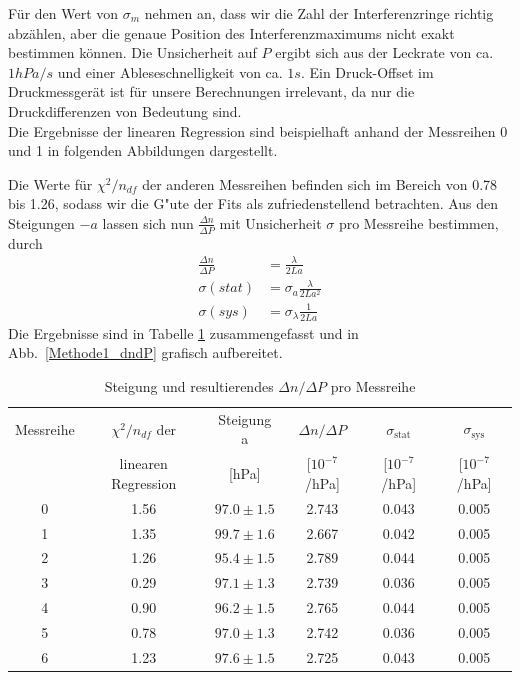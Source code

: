 \documentclass[12pt,a4paper]{article}
\begin{document}
Für den Wert von $\sigma_m$ nehmen an, dass wir die Zahl der Interferenzringe richtig abzählen, aber die genaue Position des Interferenzmaximums nicht exakt bestimmen können. Die Unsicherheit auf $P$ ergibt sich aus der Leckrate von ca. $1hPa/s$ und einer Ableseschnelligkeit von ca. $1s$. Ein Druck-Offset im Druckmessgerät ist für unsere Berechnungen irrelevant, da nur die Druckdifferenzen von Bedeutung sind. \\
Die Ergebnisse der linearen Regression sind beispielhaft anhand der Messreihen 0 und 1 in folgenden Abbildungen dargestellt.

Die Werte für $\chi^2/n_{df}$  der anderen Messreihen befinden sich im Bereich von 0.78 bis 1.26, sodass wir die G"ute der Fits als zufriedenstellend betrachten. Aus den Steigungen $-a$ lassen sich nun $\frac{\Delta n}{\Delta P}$ mit Unsicherheit $\sigma$ pro Messreihe bestimmen, durch
\begin{align}\label{eq:dndp_aus_Steigung}
\frac{\Delta n}{\Delta P}&=\frac{\lambda}{2La}\nonumber\\
\sigma(stat)&=\sigma_{a}\frac{\lambda}{2La^2}\nonumber\\
\sigma(sys)&=\sigma_{\lambda}\frac{1}{2La}
\end{align}
Die Ergebnisse sind in Tabelle \ref{table:Methode1_dndP} zusammengefasst und in Abb.~\eqref{Methode1_dndP} grafisch aufbereitet.
\begin{table}[H]
	\centering
	\begin{tabular}{|c|c|c|c|c|c|}
		\hline
		Messreihe&$\chi^2/n_{df}$ der&Steigung a &$\Delta n/\Delta P$&$\sigma_{\text{stat}}$&$\sigma_{\text{sys}}$\\
		&linearen Regression&[hPa]&[$10^{-7}$/hPa]&[$10^{-7}$/hPa]&[$10^{-7}$/hPa]\\
		\hline
		0&1.56&$97.0\pm1.5$&2.743&0.043&0.005\\
		1&1.35&$99.7\pm1.6$&2.667&0.042&0.005\\
		2&1.26&$95.4\pm1.5$&2.789&0.044&0.005\\
		3&0.29&$97.1\pm1.3$&2.739&0.036&0.005\\
		4&0.90&$96.2\pm1.5$&2.765&0.044&0.005\\
		5&0.78&$97.0\pm1.3$&2.742&0.036&0.005\\
		6&1.23&$97.6\pm1.5$&2.725&0.043&0.005\\
		\hline
	\end{tabular}
	\caption{Steigung und resultierendes $\Delta n/\Delta P$ pro Messreihe}
	\label{table:Methode1_dndP}
\end{table}
\end{document}
